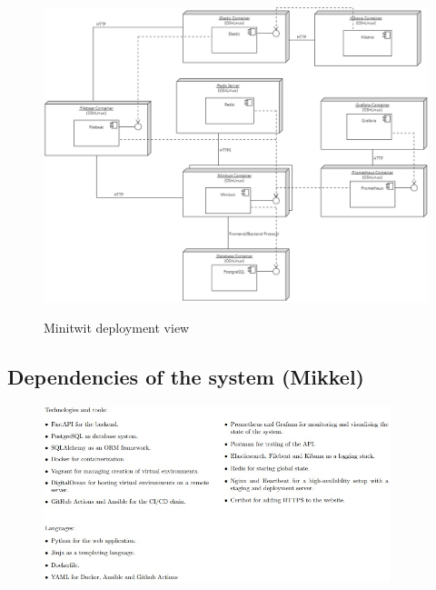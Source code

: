 \documentclass{article}
\begin{document}
\begin{figure}[h]
\includegraphics[width=1\textwidth]{images/Deployment_View_Picture.png}
\label{fig:deployment_view}
\caption{Minitwit deployment view}
\centering
\end{figure}
\newpage
\subsection{Dependencies of the system (Mikkel)}

\begin{figure}[h]
\includegraphics[width=0.9\textwidth]{images/Technologies and tools.jpg}
\centering
\end{figure}
\end{document}
